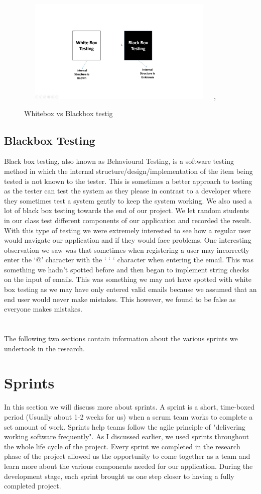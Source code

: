 \begin{figure}[ht]
\renewcommand\thefigure{3.4}
\centering
\includegraphics[width=10cm, height=5cm]{img/whitebox.jpg},
\caption{Whitebox vs Blackbox testig}
\label{whiteboxvblackbox}
\end{figure}

\subsection{Blackbox Testing}
Black box testing, also known as Behavioural Testing, is a software testing method in which the internal structure/design/implementation of the item being tested is not known to the tester. This is sometimes a better approach to testing as the tester can test the system as they please in contrast to a developer where they sometimes test a system gently to keep the system working. We also used a lot of black box testing towards the end of our project. We let random students in our class test different components of our application and recorded the result. With this type of testing we were extremely interested to see how a regular user would navigate our application and if they would face problems. One interesting observation we saw was that sometimes when registering a user may incorrectly enter the ‘@’ character with the ‘ ‘ ‘ character when entering the email. This was something we hadn’t spotted before and then began to implement string checks on the input of emails. This was something we may not have spotted with white box testing as we may have only entered valid emails because we assumed that an end user would never make mistakes. This however, we found to be false as everyone makes mistakes.
\\
\\
\\
The following two sections contain information about the various sprints we undertook in the research.

\section{Sprints} 
In this section we will discuss more about sprints. A sprint is a short, time-boxed period (Usually about 1-2 weeks for us) when a scrum team works to complete a set amount of work. Sprints help teams follow the agile principle of "delivering working software frequently". As I discussed earlier, we used sprints throughout the whole life cycle of the project. Every sprint we completed in the research phase of the project allowed us the opportunity to come together as a team and learn more about the various components needed for our application. During the development stage, each sprint brought us one step closer to having a fully completed project.


